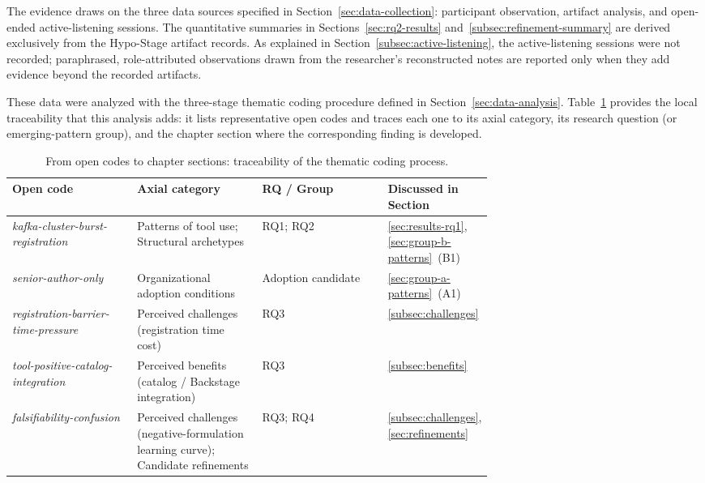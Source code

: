 The evidence draws on the three data sources specified in
Section~\ref{sec:data-collection}: participant observation, artifact analysis,
and open-ended active-listening sessions. The quantitative summaries in
Sections~\ref{sec:rq2-results} and~\ref{subsec:refinement-summary} are derived
exclusively from the Hypo-Stage artifact records. As explained in
Section~\ref{subsec:active-listening}, the active-listening sessions were not
recorded; paraphrased, role-attributed observations drawn from the researcher's
reconstructed notes are reported only when they add evidence beyond the
recorded artifacts.

These data were analyzed with the three-stage thematic coding procedure defined
in Section~\ref{sec:data-analysis}. Table~\ref{tab:code-traceability} provides
the local traceability that this analysis adds: it lists representative open
codes and traces each one to its axial category, its research question (or
emerging-pattern group), and the chapter section where the corresponding finding
is developed.

\begin{table}[htbp]
\caption{From open codes to chapter sections: traceability of the thematic coding process.}
\label{tab:code-traceability}
\centering\small
\begin{tabular}{p{0.26\linewidth} p{0.26\linewidth} l p{0.17\linewidth}}
\toprule
\textbf{Open code} & \textbf{Axial category} & \textbf{RQ / Group} & \textbf{Discussed in Section} \\
\midrule
\textit{kafka-cluster-burst-registration}
  & Patterns of tool use; Structural archetypes
  & RQ1; RQ2
  & \ref{sec:results-rq1}, \ref{sec:group-b-patterns}~(B1) \\
\midrule
\textit{senior-author-only}
  & Organizational adoption conditions
  & Adoption candidate
  & \ref{sec:group-a-patterns}~(A1) \\
\midrule
\textit{registration-barrier-time-pressure}
  & Perceived challenges (registration time cost)
  & RQ3
  & \ref{subsec:challenges} \\
\midrule
\textit{tool-positive-catalog-integration}
  & Perceived benefits (catalog / Backstage integration)
  & RQ3
  & \ref{subsec:benefits} \\
\midrule
\textit{falsifiability-confusion}
  & Perceived challenges (negative-formulation learning curve); Candidate refinements
  & RQ3; RQ4
  & \ref{subsec:challenges}, \ref{sec:refinements} \\
\bottomrule
\end{tabular}
\end{table}


